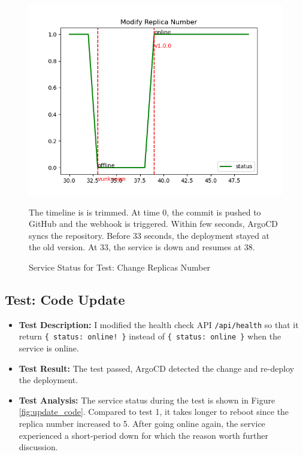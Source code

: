 \documentclass[12pt]{article}
\begin{document}
\begin{figure}[!htbp]
    \centering
    \includegraphics[width=.75\textwidth]{../code/figures/modify_replica_num.png}
    \caption{Service Status for Test: Change Replicas Number}
    \label{fig:modify_replica_num}
    \medskip
    \small
    The timeline is is trimmed. At time 0, the commit is pushed to GitHub and the webhook is triggered. Within few seconds, ArgoCD syncs the repository. Before 33 seconds, the deployment stayed at the old version. At 33, the service is down and resumes at 38.
\end{figure}

\subsection{Test: Code Update}

\begin{itemize}
    \item \textbf{Test Description:} I modified the health check API \texttt{/api/health} so that it return \texttt{\{ status: online! \}} instead of \texttt{\{ status: online \}} when the service is online.
    \item \textbf{Test Result:} The test passed, ArgoCD detected the change and re-deploy the deployment.
    \item \textbf{Test Analysis:} The service status during the test is shown in Figure \ref{fig:update_code}. Compared to test 1, it takes longer to reboot since the replica number increased to 5. After going online again, the service experienced a short-period down for which the reason worth further discussion.
\end{itemize}
\end{document}
